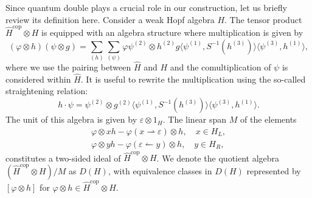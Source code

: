 \documentclass[a4paper,11pt]{article}
\theoremstyle{theorem}
\theoremstyle{remark}
\newcommand{\ctwo}{(2)}
\begin{document}
Since quantum double plays a crucial role in our construction, let us briefly review its definition here.
Consider a weak Hopf algebra \(H\). The tensor product \(\hat{H}^{\text{cop}} \otimes H\) is equipped with an algebra structure where multiplication is given by \cite{drinfel1988quantum,majid1990physics,majid1994some}
\begin{equation}
    (\varphi \otimes h) (\psi \otimes g) = \sum_{(h)} \sum_{(\psi)} \varphi \psi^{(2)} \otimes h^{(2)} g \langle \psi^{(1)}, S^{-1}(h^{(3)}) \rangle \langle \psi^{(3)}, h^{(1)} \rangle,
\end{equation}
where we use the pairing between $\hat{H}$ and $H$ and the comultiplication of \(\psi\) is considered within \(\hat{H}\).
It is useful to rewrite the multiplication using the so-called straightening relation:
\begin{equation}
   h \cdot \psi  = \psi^{\ctwo} \otimes  g^{\ctwo}  \langle \psi^{(1)}, S^{-1}(h^{(3)}) \rangle \langle \psi^{(3)}, h^{(1)} \rangle.
\end{equation}
The unit of this algebra is given by \(\varepsilon \otimes 1_H\). 
The linear span \(M\) of the elements
\begin{align}
    \varphi \otimes xh - \varphi (x\rightharpoonup \varepsilon) \otimes h, \quad x \in H_L, \\
    \varphi \otimes yh - \varphi (\varepsilon \leftharpoonup y) \otimes h, \quad y \in H_R,
\end{align}
constitutes a two-sided ideal of \(\hat{H}^{\text{cop}} \otimes H\). We denote the quotient algebra \((\hat{H}^{\text{cop}} \otimes H)/M\) as \(D(H)\), with equivalence classes in \(D(H)\) represented by \([\varphi \otimes h]\) for \(\varphi \otimes h \in \hat{H}^{\text{cop}} \otimes H\).
\end{document}
